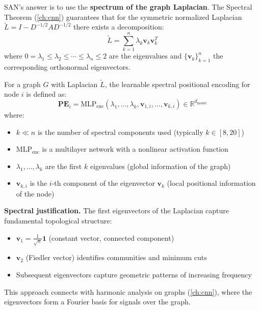 SAN's answer is to use the \textbf{spectrum of the graph Laplacian}. The Spectral Theorem (\autoref{ch:cnn}) guarantees that for the symmetric normalized Laplacian $\tilde{L} = I - D^{-1/2}AD^{-1/2}$ there exists a decomposition:
\begin{equation}
    \tilde{L} = \sum_{k=1}^{n} \lambda_k \mathbf{v}_k \mathbf{v}_k^T
    \label{eq:spectral_decomposition_san}
\end{equation}
where $0 = \lambda_1 \leq \lambda_2 \leq \cdots \leq \lambda_n \leq 2$ are the eigenvalues and $\{\mathbf{v}_k\}_{k=1}^{n}$ the corresponding orthonormal eigenvectors.

\begin{definition}\label{def:learned_spectral_pe}
For a graph $G$ with Laplacian $\tilde{L}$, the learnable spectral positional encoding for node $i$ is defined as:
\begin{equation}
    \mathbf{PE}_i = \text{MLP}_{\text{enc}}(\lambda_1, \ldots, \lambda_k, \mathbf{v}_{1,i}, \ldots, \mathbf{v}_{k,i}) \in \mathbb{R}^{d_{\text{model}}}
    \label{eq:san_learned_positional_encoding}
\end{equation}
where:
\begin{itemize}
    \item $k \ll n$ is the number of spectral components used (typically $k \in [8, 20]$)
    \item $\text{MLP}_{\text{enc}}$ is a multilayer network with a nonlinear activation function
    \item $\lambda_1, \ldots, \lambda_k$ are the first $k$ eigenvalues (global information of the graph)
    \item $\mathbf{v}_{k,i}$ is the $i$-th component of the eigenvector $\mathbf{v}_k$ (local positional information of the node)
\end{itemize}
\end{definition}

\textbf{Spectral justification.}\label{rem:justification_spectral_pe} The first eigenvectors of the Laplacian capture fundamental topological structure:
\begin{itemize}
    \item $\mathbf{v}_1 = \frac{1}{\sqrt{n}}\mathbf{1}$ (constant vector, connected component)
    \item $\mathbf{v}_2$ (Fiedler vector) identifies communities and minimum cuts
    \item Subsequent eigenvectors capture geometric patterns of increasing frequency
\end{itemize}
This approach connects with harmonic analysis on graphs (\autoref{ch:cnn}), where the eigenvectors form a Fourier basis for signals over the graph.

